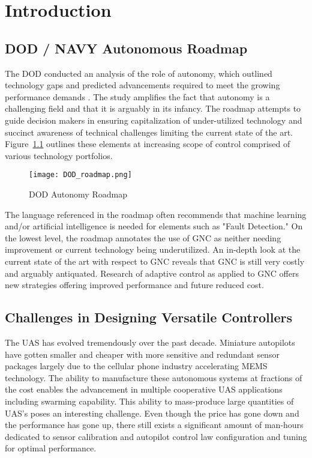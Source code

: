 \chapter{Introduction}\label{ch:intro}

\section{DOD / NAVY Autonomous Roadmap}
The \ac{DOD} conducted an analysis of the role of autonomy, which outlined technology gaps and predicted advancements required to meet the growing performance demands \cite{dodroadmap}.  The study amplifies the fact that autonomy is a challenging field and that it is arguably in its infancy.  The roadmap attempts to guide decision makers in ensuring capitalization of under-utilized technology and succinct awareness of technical challenges limiting the current state of the art.  Figure~\ref{fig:dod_roadmap} outlines these elements at increasing scope of control comprised of various technology portfolios.  
\begin{figure}[h!]
 \centering
  \texttt{[image: DOD\_roadmap.png]}
  \caption{DOD Autonomy Roadmap \cite{dodroadmap}}
  \label{fig:dod_roadmap}
\end{figure}
The language referenced in the roadmap often recommends that machine learning and/or artificial intelligence is needed for elements such as "Fault Detection."  On the lowest level, the roadmap annotates the use of \ac{GNC} as neither needing improvement or current technology being underutilized.  An in-depth look at the current state of the art with respect to \ac{GNC} reveals that \ac{GNC} is still very costly and arguably antiquated.  Research of adaptive control as applied to \ac{GNC} offers new strategies offering improved performance and future reduced cost.

\section{Challenges in Designing Versatile Controllers}
The \ac{UAS} has evolved tremendously over the past decade.  Miniature autopilots have gotten smaller and cheaper with more sensitive and redundant sensor packages largely due to the cellular phone industry accelerating \ac{MEMS} technology.  The ability to manufacture these autonomous systems at fractions of the cost enables the advancement in multiple cooperative \ac{UAS} applications including swarming capability.  This ability to mass-produce large quantities of \ac{UAS}'s poses an interesting challenge.  Even though the price has gone down and the performance has gone up, there still exists a significant amount of man-hours dedicated to sensor calibration and autopilot control law configuration and tuning for optimal performance.  

